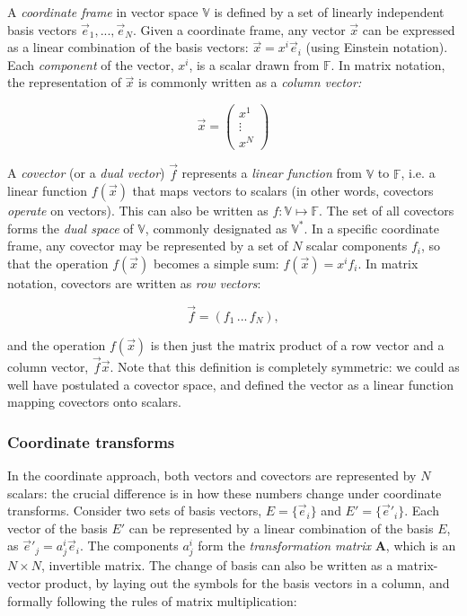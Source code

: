 \documentclass[]{aa}
\begin{document}
A {\em coordinate frame} in vector space $\mathbb{V}$ is defined by a set of linearly independent basis vectors $\vec e_1,...,\vec e_N$. Given a coordinate frame, any  vector $\vec x$ can be expressed as a linear combination of the basis vectors: $\vec x = x^i \vec e_i$ (using Einstein notation). Each \emph{component} of the vector, $x^i$, is a scalar drawn from $\mathbb{F}$. In matrix notation, the representation of $\vec x$ is commonly written as a \emph{column vector:}

\[
  \vec x = \left ( \begin{array}{c} x^1\\ \vdots \\ x^N \end{array} \right )
\]


A \emph{covector} (or a {\em dual vector\/}) $\vec f$ represents a {\em linear function} from $\mathbb{V}$ to $\mathbb{F}$, i.e. a linear function $f(\vec x)$ that maps vectors to scalars (in other words, covectors {\em operate\/} on vectors). This can also be written as $f:\mathbb{V}\mapsto\mathbb{F}$. The set of all covectors forms the {\em dual space\/} of $\mathbb{V}$, commonly designated as $\mathbb{V}^*$. In a specific coordinate frame, any covector may be represented by a set of $N$ scalar components $f_i$, so that the operation  $f(\vec x)$ becomes a simple sum: $f(\vec x) = x^if_i.$ In matrix notation, covectors are written as \emph{row vectors\/}:

\[
\vec f = \left( f_1 \, ... \, f_N \right), 
\]

and the operation $f(\vec x)$ is then just the matrix product of a row vector and a column vector, $\vec f\vec x$. Note that this definition is completely symmetric: we could as well have postulated a covector space, and defined the vector as a linear function mapping covectors onto scalars.

\subsubsection{Coordinate transforms}

In the coordinate approach, both vectors and covectors are represented by $N$ scalars: the crucial difference is in how these numbers change under coordinate transforms. Consider two sets of basis vectors, $E=\{\vec e_i\}$ and $E'=\{\vec e'_i\}$. Each vector of the basis $E'$ can be represented by a linear combination of the basis $E$, as $\vec e'_j = a^i_j \vec e_i$. The components $a^i_j$ form the {\em transformation matrix} $\mathbf{A}$, which is an $N\times N$, invertible matrix. The change of basis can also be written as a matrix-vector product, by laying out the symbols for the basis vectors in a column, and formally following the rules of matrix multiplication:
\end{document}
